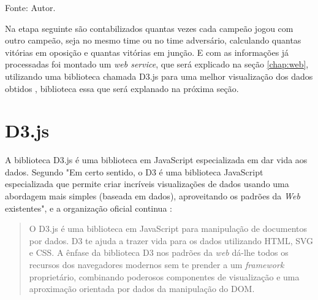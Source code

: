 \begin{table}[H]
\centering
\caption{Exemplo de \textit{subset} salvo no banco de dados}
\label{tab:subset-lol}
\small{Fonte: Autor.}
\end{table}

Na etapa seguinte são contabilizados quantas vezes cada campeão jogou com outro campeão, seja no mesmo time ou no time adversário, calculando quantas vitórias em oposição e quantas vitórias em junção.
E com as informações já processadas foi montado um \textit{web service}, que será explicado na seção \ref{chap:web}, utilizando uma biblioteca chamada D3.js para uma melhor visualização dos dados obtidos , biblioteca essa que será explanado na próxima seção.

\section{D3.js}
A biblioteca D3.js é uma biblioteca em JavaScript especializada em dar vida aos dados. Segundo \citet[tradução do autor]{d3cook} "Em certo sentido, o D3 é uma biblioteca JavaScript especializada que permite criar incríveis visualizações de dados usando uma abordagem mais simples (baseada em dados), aproveitando os padrões da \textit{Web} existentes", e a organização oficial continua :


\begin{quote}
O D3.js é uma biblioteca em JavaScript para manipulação de documentos por dados. D3 te ajuda a trazer vida para os dados utilizando HTML, SVG e CSS. A ênfase da biblioteca D3 nos padrões da \textit{web} dá-lhe todos os recursos dos navegadores modernos sem te prender a um \textit{framework} proprietário, combinando poderosos componentes de visualização e uma aproximação orientada por dados da manipulação do DOM.
\cite[tradução do autor]{d3js}
\end{quote}


